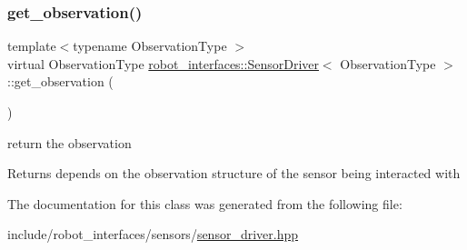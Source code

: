\subsubsection{\texorpdfstring{get\+\_\+observation()}{get\_observation()}}
{\footnotesize\ttfamily template$<$typename Observation\+Type $>$ \\
virtual Observation\+Type \hyperlink{classrobot__interfaces_1_1SensorDriver}{robot\+\_\+interfaces\+::\+Sensor\+Driver}$<$ Observation\+Type $>$\+::get\+\_\+observation (\begin{DoxyParamCaption}{ }\end{DoxyParamCaption})\hspace{0.3cm}{\ttfamily [pure virtual]}}



return the observation 

\begin{DoxyReturn}{Returns}
depends on the observation structure of the sensor being interacted with 
\end{DoxyReturn}


The documentation for this class was generated from the following file\+:\begin{DoxyCompactItemize}
\item 
include/robot\+\_\+interfaces/sensors/\hyperlink{sensor__driver_8hpp}{sensor\+\_\+driver.\+hpp}\end{DoxyCompactItemize}
